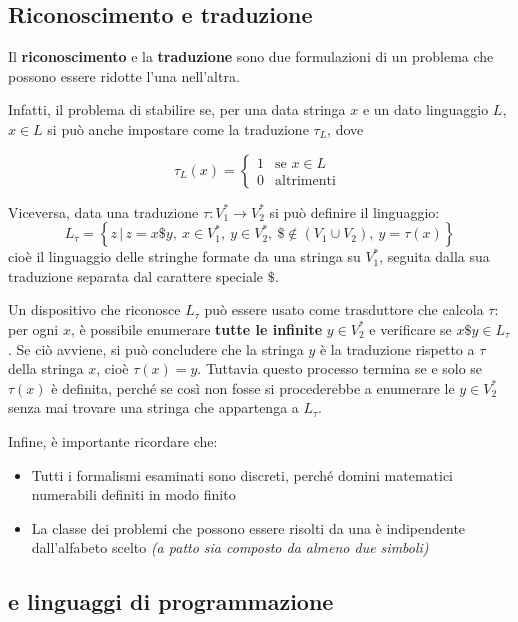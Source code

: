 \documentclass[italian, 10pt]{article}
\begin{document}
\subsection{Riconoscimento e traduzione}

Il \textbf{riconoscimento} e la \textbf{traduzione} sono due formulazioni di un problema che possono essere ridotte l'una nell'altra.

Infatti, il problema di stabilire se, per una data stringa \(x\) e un dato linguaggio \(L\), \(x \in L\) si può anche impostare come la traduzione \(\tau_L\), dove

\[ \tau_L(x) =
  \begin{cases}
    1 & \text{se } x \in L \\
    0 & \text{altrimenti }
  \end{cases} \]

\bigskip
Viceversa, data una traduzione \(\tau : V^\ast_1 \rightarrow V^\ast_2\) si può definire il linguaggio:
\[ L_\tau = \left\{ z \, | \, z = x \$ y, \ x \in V^\ast_1, \ y \in V^\ast_2, \ \$ \notin (V_1 \cup V_2), \ y = \tau(x) \right\} \]
cioè il linguaggio delle stringhe formate da una stringa su \(V^\ast_1\), seguita dalla sua traduzione separata dal carattere speciale \(\$\).

Un dispositivo che riconosce \(L_\tau\) può essere usato come trasduttore che calcola \(\tau\): per ogni \(x\), è possibile enumerare \textbf{tutte le infinite} \(y \in V^\ast_2\) e verificare se \(x \$ y \in L_\tau\).
Se ciò avviene, si può concludere che la stringa \(y\) è la traduzione rispetto a \(\tau\) della stringa \(x\), cioè \(\tau(x) = y\).
Tuttavia questo processo termina se e solo se \(\tau(x)\) è definita, perché se così non fosse si procederebbe a enumerare le \(y \in V^\ast_2\) senza mai trovare una stringa che appartenga a \(L_\tau\).

\bigskip
Infine, è importante ricordare che:

\begin{itemize}
  \item Tutti i formalismi esaminati sono discreti, perché domini matematici numerabili definiti in modo finito
  \item La classe dei problemi che possono essere risolti da una \TM è indipendente dall'alfabeto scelto \textit{(a patto sia composto da almeno due simboli)}
\end{itemize}

\subsection{\TM e linguaggi di programmazione}
\end{document}
